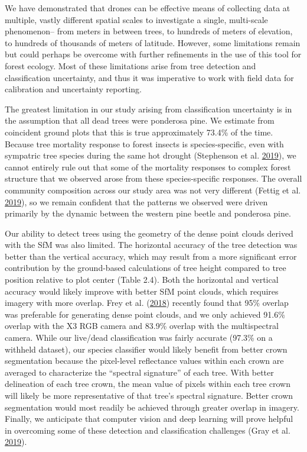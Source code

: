 \documentclass[twoside,12pt,final]{ucthesis-CA2012}
\begin{document}
\begin{ucmainmatter}
We have demonstrated that drones can be effective means of collecting
data at multiple, vastly different spatial scales to investigate a
single, multi-scale phenomenon-- from meters in between trees, to
hundreds of meters of elevation, to hundreds of thousands of meters of
latitude. However, some limitations remain but could perhaps be overcome
with further refinements in the use of this tool for forest ecology.
Most of these limitations arise from tree detection and classification
uncertainty, and thus it was imperative to work with field data for
calibration and uncertainty reporting.

The greatest limitation in our study arising from classification
uncertainty is in the assumption that all dead trees were ponderosa
pine. We estimate from coincident ground plots that this is true
approximately 73.4\% of the time. Because tree mortality response to
forest insects is species-specific, even with sympatric tree species
during the same hot drought (Stephenson et al.
\protect\hyperlink{ref-stephenson2019}{2019}), we cannot entirely rule
out that some of the mortality responses to complex forest structure
that we observed arose from these species-specific responses. The
overall community composition across our study area was not very
different (Fettig et al. \protect\hyperlink{ref-fettig2019}{2019}), so
we remain confident that the patterns we observed were driven primarily
by the dynamic between the western pine beetle and ponderosa pine.

Our ability to detect trees using the geometry of the dense point clouds
derived with the SfM was also limited. The horizontal accuracy of the
tree detection was better than the vertical accuracy, which may result
from a more significant error contribution by the ground-based
calculations of tree height compared to tree position relative to plot
center (Table 2.4). Both the horizontal and vertical accuracy would
likely improve with better SfM point clouds, which requires imagery with
more overlap. Frey et al. (\protect\hyperlink{ref-frey2018}{2018})
recently found that 95\% overlap was preferable for generating dense
point clouds, and we only achieved 91.6\% overlap with the X3 RGB camera
and 83.9\% overlap with the multispectral camera. While our live/dead
classification was fairly accurate (97.3\% on a withheld dataset), our
species classifier would likely benefit from better crown segmentation
because the pixel-level reflectance values within each crown are
averaged to characterize the ``spectral signature'' of each tree. With
better delineation of each tree crown, the mean value of pixels within
each tree crown will likely be more representative of that tree's
spectral signature. Better crown segmentation would most readily be
achieved through greater overlap in imagery. Finally, we anticipate that
computer vision and deep learning will prove helpful in overcoming some
of these detection and classification challenges (Gray et al.
\protect\hyperlink{ref-gray2019}{2019}).


\end{ucmainmatter}
\end{document}
